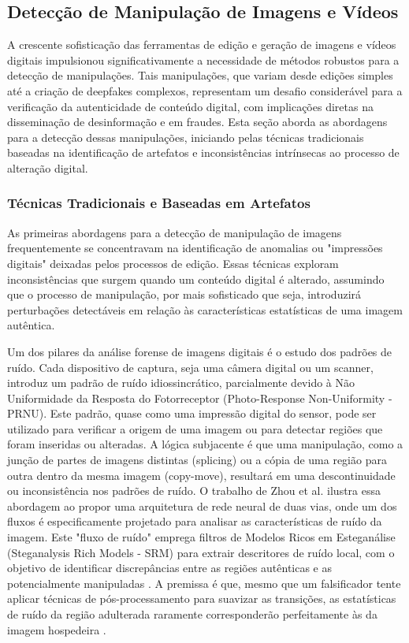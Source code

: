 \subsection{Detecção de Manipulação de Imagens e Vídeos}
\label{detecção de manipulação de imagens e vídeos}
A crescente sofisticação das ferramentas de edição e geração de imagens e vídeos digitais impulsionou significativamente a necessidade de métodos robustos para a detecção de manipulações. Tais manipulações, que variam desde edições simples até a criação de deepfakes complexos, representam um desafio considerável para a verificação da autenticidade de conteúdo digital, com implicações diretas na disseminação de desinformação e em fraudes. Esta seção aborda as abordagens para a detecção dessas manipulações, iniciando pelas técnicas tradicionais baseadas na identificação de artefatos e inconsistências intrínsecas ao processo de alteração digital.

\subsubsection{Técnicas Tradicionais e Baseadas em Artefatos}

As primeiras abordagens para a detecção de manipulação de imagens frequentemente se concentravam na identificação de anomalias ou "impressões digitais" deixadas pelos processos de edição. Essas técnicas exploram inconsistências que surgem quando um conteúdo digital é alterado, assumindo que o processo de manipulação, por mais sofisticado que seja, introduzirá perturbações detectáveis em relação às características estatísticas de uma imagem autêntica.


Um dos pilares da análise forense de imagens digitais é o estudo dos padrões de ruído. Cada dispositivo de captura, seja uma câmera digital ou um scanner, introduz um padrão de ruído idiossincrático, parcialmente devido à Não Uniformidade da Resposta do Fotorreceptor (Photo-Response Non-Uniformity - PRNU). Este padrão, quase como uma impressão digital do sensor, pode ser utilizado para verificar a origem de uma imagem ou para detectar regiões que foram inseridas ou alteradas. A lógica subjacente é que uma manipulação, como a junção de partes de imagens distintas (splicing) ou a cópia de uma região para outra dentro da mesma imagem (copy-move), resultará em uma descontinuidade ou inconsistência nos padrões de ruído. O trabalho de Zhou et al. \cite{zhou2018manipulation} ilustra essa abordagem ao propor uma arquitetura de rede neural de duas vias, onde um dos fluxos é especificamente projetado para analisar as características de ruído da imagem. Este "fluxo de ruído" emprega filtros de Modelos Ricos em Esteganálise (Steganalysis Rich Models - SRM) para extrair descritores de ruído local, com o objetivo de identificar discrepâncias entre as regiões autênticas e as potencialmente manipuladas \cite{zhou2018manipulation}. A premissa é que, mesmo que um falsificador tente aplicar técnicas de pós-processamento para suavizar as transições, as estatísticas de ruído da região adulterada raramente corresponderão perfeitamente às da imagem hospedeira \cite{zhou2018manipulation}.

